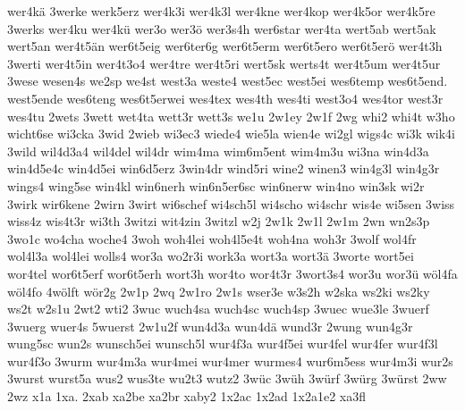 {    wer4kä
    3werke
    werk5erz
    wer4k3i
    wer4k3l
    wer4kne
    wer4kop
    wer4k5or
    wer4k5re
    3werks
    wer4ku
    wer4kü
    wer3o
    wer3ö
    wer3s4h
    wer6star
    wer4ta
    wert5ab
    wert5ak
    wert5an
    wer4t5än
    wer6t5eig
    wer6ter6g
    wer6t5erm
    wer6t5ero
    wer6t5erö
    wer4t3h
    3werti
    wer4t5in
    wer4t3o4
    wer4tre
    wer4t5ri
    wert5sk
    werts4t
    wer4t5um
    wer4t5ur
    3wese
    wesen4s
    we2sp
    we4st
    west3a
    weste4
    west5ec
    west5ei
    wes6temp
    wes6t5end.
    west5ende
    wes6teng
    wes6t5erwei
    wes4tex
    wes4th
    wes4ti
    west3o4
    wes4tor
    west3r
    wes4tu
    2wets
    3wett
    wet4ta
    wett3r
    wett3s
    we1u
    2w1ey
    2w1f
    2wg
    whi2
    whi4t
    w3ho
    wicht6se
    wi3cka
    3wid
    2wieb
    wi3ec3
    wiede4
    wie5la
    wien4e
    wi2gl
    wigs4c
    wi3k
    wik4i
    3wild
    wil4d3a4
    wil4del
    wil4dr
    wim4ma
    wim6m5ent
    wim4m3u
    wi3na
    win4d3a
    win4d5e4c
    win4d5ei
    win6d5erz
    3win4dr
    wind5ri
    wine2
    winen3
    win4g3l
    win4g3r
    wings4
    wing5se
    win4kl
    win6nerh
    win6n5er6sc
    win6nerw
    win4no
    win3sk
    wi2r
    3wirk
    wir6kene
    2wirn
    3wirt
    wi6schef
    wi4sch5l
    wi4scho
    wi4schr
    wis4e
    wi5sen
    3wiss
    wiss4z
    wis4t3r
    wi3th
    3witzi
    wit4zin
    3witzl
    w2j
    2w1k
    2w1l
    2w1m
    2wn
    wn2s3p
    3wo1c
    wo4cha
    woche4
    3woh
    woh4lei
    woh4l5e4t
    woh4na
    woh3r
    3wolf
    wol4fr
    wol4l3a
    wol4lei
    wolls4
    wor3a
    wo2r3i
    work3a
    wort3a
    wort3ä
    3worte
    wort5ei
    wor4tel
    wor6t5erf
    wor6t5erh
    wort3h
    wor4to
    wor4t3r
    3wort3s4
    wor3u
    wor3ü
    wöl4fa
    wöl4fo
    4wölft
    wör2g
    2w1p
    2wq
    2w1ro
    2w1s
    wser3e
    w3s2h
    w2ska
    ws2ki
    ws2ky
    ws2t
    w2s1u
    2wt2
    wti2
    3wuc
    wuch4sa
    wuch4sc
    wuch4sp
    3wuec
    wue3le
    3wuerf
    3wuerg
    wuer4s
    5wuerst
    2w1u2f
    wun4d3a
    wun4dä
    wund3r
    2wung
    wun4g3r
    wung5sc
    wun2s
    wunsch5ei
    wunsch5l
    wur4f3a
    wur4f5ei
    wur4fel
    wur4fer
    wur4f3l
    wur4f3o
    3wurm
    wur4m3a
    wur4mei
    wur4mer
    wurmes4
    wur6m5ess
    wur4m3i
    wur2s
    3wurst
    wurst5a
    wus2
    wus3te
    wu2t3
    wutz2
    3wüc
    3wüh
    3würf
    3würg
    3würst
    2ww
    2wz
    x1a
    1xa.
    2xab
    xa2be
    xa2br
    xaby2
    1x2ac
    1x2ad
    1x2a1e2
    xa3fl
}
